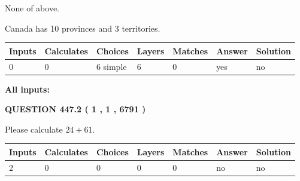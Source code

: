 \documentclass[12pt]{article}
\begin{document}
 
 None of above.
 
 
\noindent{}
 
 
Canada has 10  provinces and 3 territories.
 
 
\noindent{}
 
 
   
   
   
   
\noindent\begin{tabular}{|l|l|l|l|l|l|l|}
 \hline
Inputs & Calculates & Choices & Layers & Matches & Answer & Solution \\ \hline
 0  & 
 0  & 
 6
  simple  
  & 
 6  & 
 0  & 
  yes & 
  no 
  \\ \hline
 \end{tabular}
   
   
   
   
\noindent{}
   
   
   
   
\noindent\vspace{0.1in}\hspace{-0.08in} {\textbf{\Large{All inputs: }}}
   
   
  
\vspace{0.2in}
  
{\textbf{\Large{QUESTION
447.2 
 ( 1 , 1 , 6791 )
}}}
  
  
 
Please calculate $ %
24 +  %
61 $.
 
 
   
   
   
   
\noindent\begin{tabular}{|l|l|l|l|l|l|l|}
 \hline
Inputs & Calculates & Choices & Layers & Matches & Answer & Solution \\ \hline
 2  & 
 0  & 
 0
  & 
 0  & 
 0  & 
  no & 
  no 
  \\ \hline
 \end{tabular}
   
   
   
   
\noindent{}
   
\end{document}
